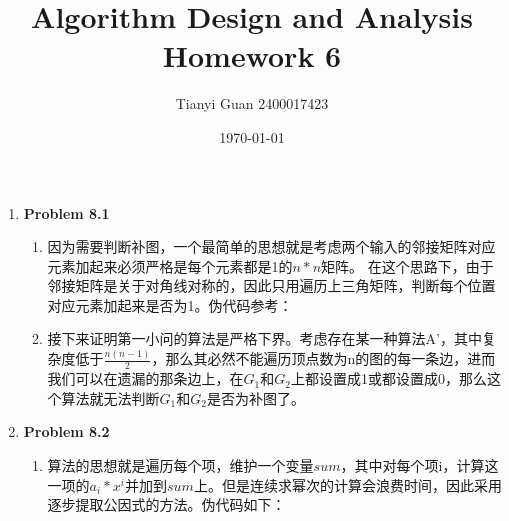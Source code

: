 \documentclass{ctexart}
\title{\vspace*{-1cm}Algorithm Design and Analysis Homework 6}
\author{Tianyi Guan 2400017423}
\date{\today}
\begin{document}
\maketitle

\begin{enumerate}[label=\arabic*.]
    \item \textbf{Problem 8.1}
        \begin{enumerate}[label=(\arabic*)]
            \item 因为需要判断补图，一个最简单的思想就是考虑两个输入的邻接矩阵对应元素加起来必须严格是每个元素都是1的$n*n$矩阵。
                在这个思路下，由于邻接矩阵是关于对角线对称的，因此只用遍历上三角矩阵，判断每个位置对应元素加起来是否为1。伪代码参考：\\
                \begin{algorithm}[H]
                    \caption{判定两个简单图是否为补图}
                    \label{algo:complement_graph}
                    
                    \Return {}\; 
                \end{algorithm}
            \item 接下来证明第一小问的算法是严格下界。考虑存在某一种算法A'，其中复杂度低于$\frac{n(n-1)}{2}$，那么其必然不能遍历顶点数为n的图的每一条边，进而我们可以在遗漏的那条边上，在$G_1$和$G_2$上都设置成1或都设置成0，那么这个算法就无法判断$G_1$和$G_2$是否为补图了。
        \end{enumerate}
    \item \textbf{Problem 8.2}
        \begin{enumerate}[label=(\arabic*)]
            \item 算法的思想就是遍历每个项，维护一个变量$sum$，其中对每个项i，计算这一项的$a_i*x^i$并加到$sum$上。但是连续求幂次的计算会浪费时间，因此采用逐步提取公因式的方法。伪代码如下：\\
                \begin{algorithm}[H]
                \caption{多项式求值算法}
                \label{algo:horner}
                

\end{algorithm}
\end{enumerate}
\end{enumerate}
\end{document}
